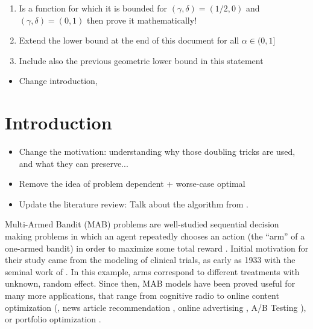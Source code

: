 \documentclass[12pt]{colt2018} %
\begin{document}
\begin{enumerate}
    \item Is a function for which it is bounded for $(\gamma,\delta)=(1/2,0)$ and $(\gamma,\delta)=(0,1)$ then prove it mathematically!
    \item Extend the lower bound at the end of this document for all $\alpha \in (0,1]$
    \item Include also the previous geometric lower bound in this statement
\end{enumerate}

\begin{itemize}
    \item Change introduction,
\end{itemize}


\section{Introduction}

    \begin{itemize}
        \item
        Change the motivation:
        understanding why those doubling tricks are used, and what they can preserve...
        \item
        Remove the idea of problem dependent + worse-case optimal
        \item
        Update the literature review:
        Talk about the \KLUCBswitch{} algorithm from \cite{GarivierHadiji2018}.
    \end{itemize}

Multi-Armed Bandit (MAB) problems are well-studied sequential decision making problems in which an agent repeatedly chooses an action (the ``arm'' of a one-armed bandit) in order to maximize some total reward \citep{Robbins52,LaiRobbins85}.
Initial motivation for their study came from the modeling of clinical trials, as early as 1933 with the seminal work of \cite{Thompson33}.
In this example, arms correspond to different treatments with unknown, random effect.
Since then, MAB models have been proved useful for many more applications, that range from
cognitive radio \citep{Jouini09} to
online content optimization (\eg, news article recommendation \citep{Li10}, online advertising \citep{LiChapelle11}, A/B Testing \citep{Kaufmann14,Jamieson17ABTest}),
or portfolio optimization \citep{Sani2012risk}.
\end{document}

